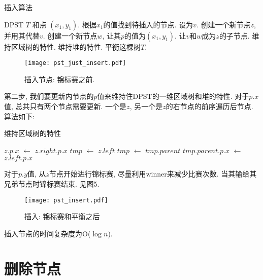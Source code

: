 \documentclass[a4paper]{article}
\begin{document}
\begin{algorithm}[!h]
\caption{插入算法} \label{alg:pst_insert}
    \begin{algorithmic}[1]
     \REQUIRE DPST $T$ 和点 $(x_1,y_1)$. 
     \STATE 根据$x_1$的值找到待插入的节点. 设为$v$.
     \STATE 创建一个新节点$z$, 并用其代替$v$.
     \STATE 创建一个新节点$w$, 让其$p$的值为$(x_1,y_1)$.
     \STATE 让$v$和$w$成为$z$的子节点.
     \STATE 维持区域树的特性.
     \STATE 维持堆的特性. 
     \STATE 平衡这棵树$T$.
    \end{algorithmic}
\end{algorithm}

\begin{figure*}[!h]
  \centering
  \texttt{[image: pst\_just\_insert.pdf]}\\
  \caption{插入节点: 锦标赛之前.}\label{fig:pst_just_insert}
\end{figure*}

第二步, 我们要更新内节点的$p$值来维持住DPST的一维区域树和堆的特性. 
对于$p.x$值, 总共只有两个节点需要更新. 一个是$z$, 另一个是$z$的右节点的前序遍历后节点.
算法如下:


\begin{algorithm}[!h]
\caption{维持区域树的特性} \label{alg:rangetreefeature}
	\begin{algorithmic}[1]
	\STATE $z.p.x$ $\leftarrow$ $z.right.p.x$
	\STATE $tmp$ $\leftarrow$ $z.left$
	\STATE $tmp$ $\leftarrow$ $tmp.parent$
	\STATE $tmp.parent.p.x$ $\leftarrow$ $z.left.p.x$
	\ENDIF
	\ENDWHILE
	\end{algorithmic}
\end{algorithm}

对于$p.y$值, 从$z$节点开始进行锦标赛, 尽量利用winner来减少比赛次数.
当其输给其兄弟节点时锦标赛结束. 见图5. 

\begin{figure*}[!h]
  \centering
  \texttt{[image: pst\_insert.pdf]}\\
  \caption{插入: 锦标赛和平衡之后}\label{fig:pst_insert}
\end{figure*}

插入节点的时间复杂度为O($\log n$). 


\section{删除节点}
\end{document}
